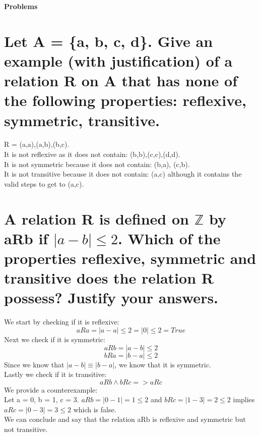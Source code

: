 \textbf{\Huge Problems}
\section{Let A = \{a, b, c, d\}. Give an example (with justification) of a relation R on A that has none of the following properties: reflexive, symmetric, transitive.}
R = {(a,a),(a,b),(b,c)}.\\
It is not reflexive as it does not contain: (b,b),(c,c),(d,d).\\
It is not symmetric because it does not contain: (b,a), (c,b).\\
It is not transitive because it does not contain: (a,c) although it contains the valid steps to get to (a,c).
\newpage

\section{A relation R is defined on $\mathbb{Z}$ by aRb if $|a-b|\leq 2$. Which of the properties reflexive, symmetric and transitive does the relation R possess? Justify your answers.}
We start by checking if it is reflexive:\\
\begin{equation}
aRa = |a-a|\leq 2 = |0|\leq 2 = True
\end{equation}
Next we check if it is symmetric:
\begin{equation}
aRb = |a-b|\leq 2
\end{equation}
\begin{equation}
bRa = |b-a|\leq 2
\end{equation}
Since we know that $|a-b| \equiv |b-a|$, we know that it is symmetric.\\
Lastly we check if it is transitive:
\begin{equation}
aRb \wedge bRc => aRc
\end{equation}
We provide a counterexample:\\
Let a = 0, b = 1, c = 3.
$aRb = |0-1|=1 \leq 2$ and $bRc = |1-3|=2 \leq 2$ implies $aRc = |0-3|= 3 \leq 2$ which is false.\\
We can conclude and say that the relation aRb is reflexive and symmetric but not transitive. 
\newpage
